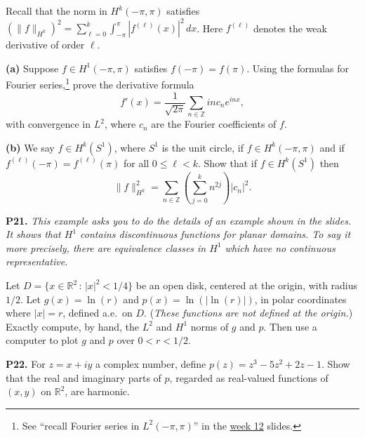 \documentclass[12pt]{amsart}
\newcommand{\RR}{\mathbb{R}}
\newcommand{\ZZ}{\mathbb{Z}}
\newcommand{\prob}[1]{\bigskip\noindent\textbf{#1.}\quad }
\newcommand{\epart}[1]{\medskip\noindent\textbf{(#1)}\quad }
\newcommand{\ds}{\displaystyle}
\begin{document}
\medskip \noindent Recall that the norm in $H^k(-\pi,\pi)$ satisfies $\ds (\|f\|_{H^k})^2 = \sum_{\ell=0}^k \int_{-\pi}^\pi |f^{(\ell)}(x)|^2\,dx$.  Here $f^{(\ell)}$ denotes the weak derivative of order $\ell$.

\epart{a}  Suppose $f\in H^1(-\pi,\pi)$ satisfies $f(-\pi)=f(\pi)$.  Using the formulas for Fourier series,\footnote{See ``recall Fourier series in $L^2(-\pi,\pi)$'' in the \href{https://bueler.github.io/fa/assets/slides/S26/week12.pdf}{week 12} slides.} prove the derivative formula
	$$f'(x) = \frac{1}{\sqrt{2\pi}} \sum_{n\in\ZZ} i n c_n e^{inx},$$
with convergence in $L^2$, where $c_n$ are the Fourier coefficients of $f$.

\epart{b}  We say $f\in H^k(S^1)$, where $S^1$ is the unit circle, if $f\in H^k(-\pi,\pi)$ and if $f^{(\ell)}(-\pi)=f^{(\ell)}(\pi)$ for all $0\le \ell < k$.  Show that if $f\in H^k(S^1)$ then
	$$\|f\|_{H^k}^2 = \sum_{n\in\ZZ} \left(\sum_{j=0}^k n^{2j}\right) |c_n|^2.$$

\prob{P21}  \emph{This example asks you to do the details of an example shown in the slides.  It shows that $H^1$ contains discontinuous functions for planar domains.  To say it more precisely, there are equivalence classes in $H^1$ which have no continuous representative.}

\medskip \noindent Let $D = \{x\in \RR^2\,:\,|x|^2 < 1/4\}$ be an open disk, centered at the origin, with radius $1/2$.  Let $g(x)=\ln(r)$ and $p(x)=\ln(|\ln(r)|)$, in polar coordinates where $|x|=r$, defined a.e.~on $D$.  (\emph{These functions are not defined at the origin.})  Exactly compute, by hand, the $L^2$ and $H^1$ norms of $g$ and $p$.  Then use a computer to plot $g$ and $p$ over $0 < r < 1/2$.

\prob{P22}  For $z=x+iy$ a complex number, define $p(z)=z^3 - 5 z^2 + 2 z - 1$.  Show that the real and imaginary parts of $p$, regarded as real-valued functions of $(x,y)$ on $\RR^2$, are harmonic.
\end{document}
